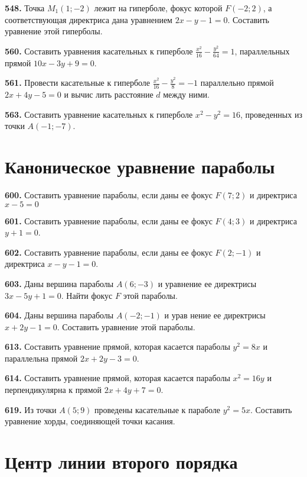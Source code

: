 \textbf{548.} Точка $M_1(1 ;-2)$ лежит на гиперболе, фокус которой $F(-2 ; 2)$, а соответствующая директриса дана уравнением $2 x-y-1=0$. Составить уравнение этой гиперболы.

\textbf{560.} Составить уравнения касательных к гиперболе $\frac{x^2}{16}-\frac{y^2}{64}=1$, параллельных прямой $10 x-3 y+9=0$.

\textbf{561.} Провести касательные к гиперболе $\frac{x^2}{16}-\frac{y^2}{8}=-1$ параллельно прямой $2 x+4 y-5=0$ и вычис лить расстояние $d$ между ними.

\textbf{563.} Составить уравнение касательных к гиперболе $x^2-y^2=16$, проведенных из точки $A(-1 ;-7)$.



\section{Каноническое уравнение параболы}



\textbf{600.} Составить уравнение параболы, если даны ее фокус $F(7 ; 2)$ и директриса $x-5=0$

\textbf{601.} Составить уравнение параболы, если даны ее фокус $F(4 ; 3)$ и директриса $y+1=0$.

\textbf{602.} Составить уравнение параболы, если даны ее фокус $F(2 ;-1)$ и директриса $x-y-1=0$.

\textbf{603.} Даны вершина параболы $A(6 ;-3)$ и уравнение ее директрисы $3 x-5 y+1=0$. Найти фокус $F$ этой параболы.

\textbf{604.} Даны вершина параболы $A(-2 ;-1)$ и урав нение ее директрисы $x+2 y-1=0$. Составить уравнение этой параболы.

\textbf{613.} Составить уравнение прямой, которая касается параболы $y^2=8 x$ и параллельна прямой $2 x+2 y-3=0$.

\textbf{614.} Составить уравнение прямой, которая касается параболы $x^2=16 y$ и перпендикулярна к прямой $2 x+4 y+7=0$.

\textbf{619.} Из точки $A(5 ; 9)$ проведены касательные к параболе $y^2=5 x$. Составить уравнение хорды, соединяющей точки касания.



\section{ Центр линии второго порядка }



